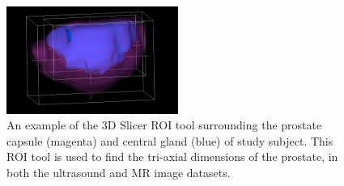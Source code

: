 \begin{figure}
\centering
\includegraphics[width=0.5\textwidth]{tyler/ROI_methods.png}
\caption{An example of the 3D Slicer ROI tool surrounding the prostate capsule (magenta)
    and central gland (blue) of study subject. This ROI tool is used to find the
    tri-axial dimensions of the prostate, in both the ultrasound and MR image
    datasets.}
\label{fig:roi_tool} 
\end{figure}
